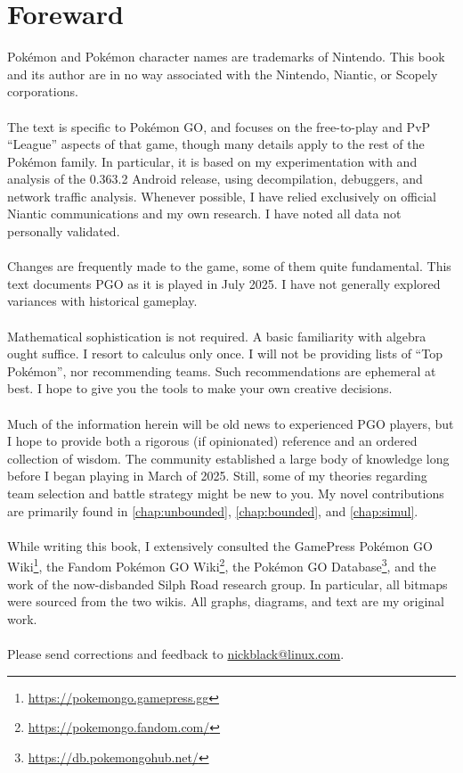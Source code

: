 \clearpage
\chapter{Foreward}

\noindent{}Pokémon and Pokémon character names are trademarks of Nintendo.
This book and its author are in no way associated with the Nintendo, Niantic,
  or Scopely corporations.\\
\\
\noindent{}The text is specific to Pokémon GO, and focuses on the free-to-play and PvP
  ``League'' aspects of that game, though many details
  apply to the rest of the Pokémon family.
In particular, it is based on my experimentation with and analysis of
 the 0.363.2 Android release, using decompilation, debuggers, and
 network traffic analysis.
Whenever possible, I have relied exclusively on official Niantic communications
 and my own research.
I have noted all data not personally validated.\\
\\
\noindent{}Changes are frequently made to the game, some of them quite fundamental.
This text documents PGO as it is played in July 2025.
I have not generally explored variances with historical gameplay.\\
\\
\noindent{}Mathematical sophistication is not required.
A basic familiarity with algebra ought suffice.
I resort to calculus only once.
I will not be providing lists of ``Top Pokémon'', nor recommending teams.
Such recommendations are ephemeral at best.
I hope to give you the tools to make your own creative decisions.\\
\\
\noindent{}Much of the information herein will be old news to experienced
 PGO players, but I hope to provide both a rigorous (if opinionated) reference and an ordered collection of wisdom.
The community established a large body of knowledge long before I
 began playing in March of 2025.
Still, some of my theories regarding team selection and battle strategy might
  be new to you.
My novel contributions are primarily found in \autoref{chap:unbounded},
  \autoref{chap:bounded}, and \autoref{chap:simul}.\\
\\
\noindent{}While writing this book, I extensively consulted the
  GamePress Pokémon GO Wiki\footnote{\url{https://pokemongo.gamepress.gg}},
  the Fandom Pokémon GO Wiki\footnote{\url{https://pokemongo.fandom.com/}},
  the Pokémon GO Database\footnote{\url{https://db.pokemongohub.net/}},
  and the work of the now-disbanded Silph Road research group.
In particular, all bitmaps were sourced from the two wikis.
All graphs, diagrams, and text are my original work.\\
\\
\noindent{}Please send corrections and feedback to 
  \href{mailto:nickblack@linux.com}{nickblack@linux.com}.
\mainmatter
